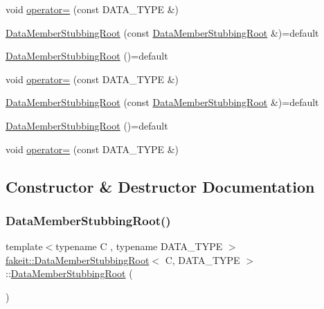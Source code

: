 \begin{DoxyCompactItemize}
void \mbox{\hyperlink{classfakeit_1_1DataMemberStubbingRoot_a9658c86eff24d9703cda9318c0c59001}{operator=}} (const D\+A\+T\+A\+\_\+\+T\+Y\+PE \&)
\item 
\mbox{\hyperlink{classfakeit_1_1DataMemberStubbingRoot_a55cf882f6905323f1d5f227bafce29a3}{Data\+Member\+Stubbing\+Root}} (const \mbox{\hyperlink{classfakeit_1_1DataMemberStubbingRoot}{Data\+Member\+Stubbing\+Root}} \&)=default
\item 
\mbox{\hyperlink{classfakeit_1_1DataMemberStubbingRoot_aa412dfee88ec661b0db74915cbfc96ca}{Data\+Member\+Stubbing\+Root}} ()=default
\item 
void \mbox{\hyperlink{classfakeit_1_1DataMemberStubbingRoot_a9658c86eff24d9703cda9318c0c59001}{operator=}} (const D\+A\+T\+A\+\_\+\+T\+Y\+PE \&)
\item 
\mbox{\hyperlink{classfakeit_1_1DataMemberStubbingRoot_a55cf882f6905323f1d5f227bafce29a3}{Data\+Member\+Stubbing\+Root}} (const \mbox{\hyperlink{classfakeit_1_1DataMemberStubbingRoot}{Data\+Member\+Stubbing\+Root}} \&)=default
\item 
\mbox{\hyperlink{classfakeit_1_1DataMemberStubbingRoot_aa412dfee88ec661b0db74915cbfc96ca}{Data\+Member\+Stubbing\+Root}} ()=default
\item 
void \mbox{\hyperlink{classfakeit_1_1DataMemberStubbingRoot_a9658c86eff24d9703cda9318c0c59001}{operator=}} (const D\+A\+T\+A\+\_\+\+T\+Y\+PE \&)
\end{DoxyCompactItemize}


\subsection{Constructor \& Destructor Documentation}
\mbox{\label{classfakeit_1_1DataMemberStubbingRoot_a55cf882f6905323f1d5f227bafce29a3}} 
\subsubsection{\texorpdfstring{DataMemberStubbingRoot()}{DataMemberStubbingRoot()}\hspace{0.1cm}{\footnotesize\ttfamily [1/18]}}
{\footnotesize\ttfamily template$<$typename C , typename D\+A\+T\+A\+\_\+\+T\+Y\+PE $>$ \\
\mbox{\hyperlink{classfakeit_1_1DataMemberStubbingRoot}{fakeit\+::\+Data\+Member\+Stubbing\+Root}}$<$ C, D\+A\+T\+A\+\_\+\+T\+Y\+PE $>$\+::\mbox{\hyperlink{classfakeit_1_1DataMemberStubbingRoot}{Data\+Member\+Stubbing\+Root}} (\begin{DoxyParamCaption}\item[{const \mbox{\hyperlink{classfakeit_1_1DataMemberStubbingRoot}{Data\+Member\+Stubbing\+Root}}$<$ C, D\+A\+T\+A\+\_\+\+T\+Y\+PE $>$ \&}]{ }\end{DoxyParamCaption})\hspace{0.3cm}{\ttfamily [default]}}


